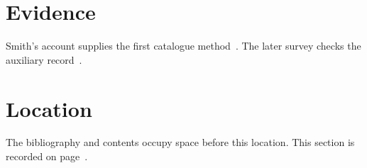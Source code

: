 \documentclass{article}
\begin{document}
\tableofcontents
\section{Evidence}
Smith's account supplies the first catalogue method~\cite{smith2020}.
The later survey checks the auxiliary record~\cite{doe2021}.
\section{Location}\label{sec:location}
The bibliography and contents occupy space before this location.
This section is recorded on page~\pageref{sec:location}.


\end{document}
